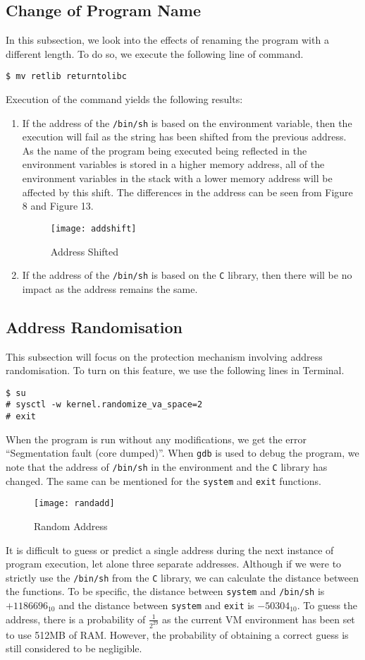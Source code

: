 \documentclass[a4paper,12pt]{article}
\begin{document}
\subsection{Change of Program Name}
In this subsection, we look into the effects of renaming the program with a different length. To do so, we execute the following line of command.
\begin{verbatim}
$ mv retlib returntolibc
\end{verbatim}
Execution of the command yields the following results:
\begin{enumerate}
	\item If the address of the \texttt{/bin/sh} is based on the environment variable, then the execution will fail as the string has been shifted from the previous address. As the name of the program being executed being reflected in the environment variables is stored in a higher memory address, all of the environment variables in the stack with a lower memory address will be affected by this shift. The differences in the address can be seen from Figure 8 and Figure 13.
	\begin{figure}[H]
		\centering
		\texttt{[image: addshift]}
		\caption{Address Shifted}
		\label{fig:addshift}
	\end{figure}
	\item If the address of the \texttt{/bin/sh} is based on the \texttt{C} library, then there will be no impact as the address remains the same.
\end{enumerate}
\subsection{Address Randomisation}
This subsection will focus on the protection mechanism involving address randomisation. To turn on this feature, we use the following lines in Terminal.
\begin{verbatim}
$ su
# sysctl -w kernel.randomize_va_space=2
# exit
\end{verbatim}
When the program is run without any modifications, we get the error ``Segmentation fault (core dumped)''. When \texttt{gdb} is used to debug the program, we note that the address of \texttt{/bin/sh} in the environment and the \texttt{C} library has changed. The same can be mentioned for the \texttt{system} and \texttt{exit} functions.
\begin{figure}[H]
	\centering
	\texttt{[image: randadd]}
	\caption{Random Address}
	\label{fig:randadd}
\end{figure}
\noindent It is difficult to guess or predict a single address during the next instance of program execution, let alone three separate addresses. Although if we were to strictly use the \texttt{/bin/sh} from the \texttt{C} library, we can calculate the distance between the functions. To be specific, the distance between \texttt{system} and \texttt{/bin/sh} is $+1186696_{10}$ and the distance between \texttt{system} and \texttt{exit} is $-50304_{10}$. To guess the address, there is a probability of $\frac{1}{2^{29}}$ as the current VM environment has been set to use 512MB of RAM. However, the probability of obtaining a correct guess is still considered to be negligible.
\end{document}
